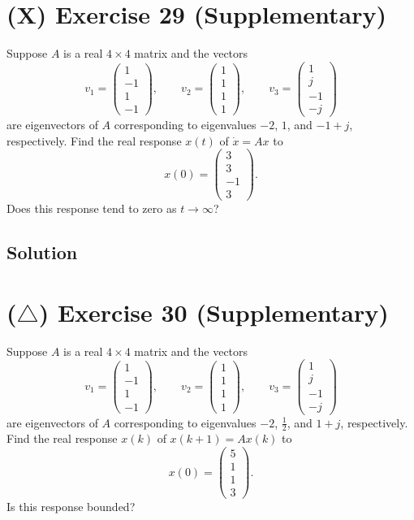 \documentclass[12pt,a4paper]{article}
\begin{document}
\section*{(X) Exercise 29 \hfill {\normalsize (Supplementary)}}
Suppose $A$ is a real $4\times4$ matrix and the vectors
\[
v_1=\begin{pmatrix}1\\-1\\1\\-1\end{pmatrix},\qquad
v_2=\begin{pmatrix}1\\1\\1\\1\end{pmatrix},\qquad
v_3=\begin{pmatrix}1\\j\\-1\\-j\end{pmatrix}
\]
are eigenvectors of $A$ corresponding to eigenvalues $-2$, $1$, and
$-1+j$, respectively. Find the real response $x(t)$ of $\dot x=Ax$ to
\[
x(0)=\begin{pmatrix}3\\3\\-1\\3\end{pmatrix}.
\]
Does this response tend to zero as $t\to\infty$?
\subsection*{Solution}
\vspace{4cm}
\clearpage
\section*{($\triangle$) Exercise 30 \hfill {\normalsize (Supplementary)}}
Suppose $A$ is a real $4\times4$ matrix and the vectors
\[
v_1=\begin{pmatrix}1\\-1\\1\\-1\end{pmatrix},\qquad
v_2=\begin{pmatrix}1\\1\\1\\1\end{pmatrix},\qquad
v_3=\begin{pmatrix}1\\j\\-1\\-j\end{pmatrix}
\]
are eigenvectors of $A$ corresponding to eigenvalues $-2$, $\tfrac12$, and
$1+j$, respectively. Find the real response $x(k)$ of
$x(k+1)=Ax(k)$ to
\[
x(0)=\begin{pmatrix}5\\1\\1\\3\end{pmatrix}.
\]
Is this response bounded?
\end{document}
